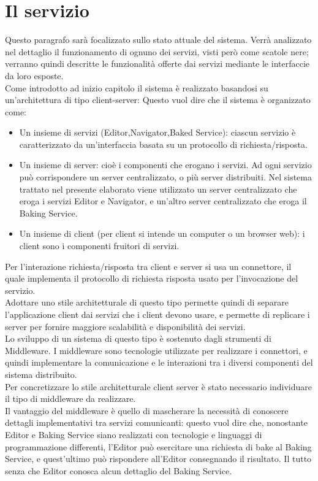 \newpage
\section{Il servizio}
\label{sec:chapter_architettura_sistema_il_servizio}

Questo paragrafo sarà focalizzato sullo stato attuale del sistema. Verrà analizzato nel dettaglio il funzionamento di ognuno dei servizi, visti però come scatole nere; verranno quindi descritte le funzionalità offerte dai servizi mediante le interfaccie da loro esposte.
\\
Come introdotto ad inizio capitolo il sistema è realizzato basandosi su un’architettura di tipo client-server: Questo vuol dire che il sistema è organizzato come:
\begin{itemize}
\item Un insieme di servizi (Editor,Navigator,Baked Service): ciascun servizio è caratterizzato da un’interfaccia basata su un protocollo di richiesta/risposta.
\item Un insieme di server: cioè i componenti che erogano i servizi. Ad ogni servizio può corrispondere un server centralizzato, o più server distribuiti. Nel sistema trattato nel presente elaborato viene utilizzato un server centralizzato che eroga i servizi Editor e Navigator, e un’altro server centralizzato che eroga il Baking Service.
\item Un insieme di client (per client si intende un computer o un browser web): i client sono i componenti fruitori di servizi.
\end{itemize}
Per l’interazione richiesta/risposta tra client e server si usa un connettore, il quale implementa il protocollo di richiesta risposta usato per l’invocazione del servizio.
\\
Adottare uno stile architetturale di questo tipo permette quindi di separare l’applicazione client dai servizi che i client devono usare, e permette di replicare i server per fornire maggiore scalabilità e disponibilità dei servizi. 
\\
Lo sviluppo di un sistema di questo tipo è sostenuto dagli strumenti di Middleware. I middleware sono tecnologie utilizzate per realizzare i connettori, e quindi implementare la comunicazione e le interazioni tra i diversi componenti del sistema distribuito.
\\  
Per concretizzare lo stile architetturale client server è stato necessario individuare il tipo di middleware da realizzare. 
\\
Il vantaggio del middleware è quello di mascherare la necessità di conoscere dettagli implementativi tra servizi comunicanti: questo vuol dire che, nonostante Editor e Baking Service siano realizzati con tecnologie e linguaggi di programmazione differenti, l’Editor può esercitare una richiesta di bake al Baking Service, e quest’ultimo può rispondere all’Editor consegnando il risultato. Il tutto senza che Editor conosca alcun dettaglio del Baking Service.
